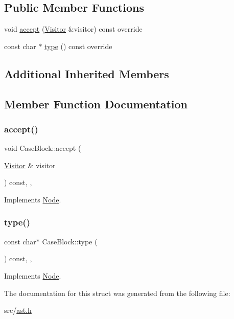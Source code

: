 \subsection*{Public Member Functions}
\begin{DoxyCompactItemize}
\item 
void \hyperlink{struct_case_block_aa49886b51bde7cb23e5c4faf1f32cd5e}{accept} (\hyperlink{struct_visitor}{Visitor} \&visitor) const override
\item 
const char $\ast$ \hyperlink{struct_case_block_a3c4f5d4f02856e2702c4b376914c44f9}{type} () const override
\end{DoxyCompactItemize}
\subsection*{Additional Inherited Members}


\subsection{Member Function Documentation}
\mbox{\label{struct_case_block_aa49886b51bde7cb23e5c4faf1f32cd5e}} 
\subsubsection{\texorpdfstring{accept()}{accept()}}
{\footnotesize\ttfamily void Case\+Block\+::accept (\begin{DoxyParamCaption}\item[{\hyperlink{struct_visitor}{Visitor} \&}]{visitor }\end{DoxyParamCaption}) const\hspace{0.3cm}{\ttfamily [inline]}, {\ttfamily [override]}, {\ttfamily [virtual]}}



Implements \hyperlink{struct_node_a10bd7af968140bbf5fa461298a969c71}{Node}.

\mbox{\label{struct_case_block_a3c4f5d4f02856e2702c4b376914c44f9}} 
\subsubsection{\texorpdfstring{type()}{type()}}
{\footnotesize\ttfamily const char$\ast$ Case\+Block\+::type (\begin{DoxyParamCaption}{ }\end{DoxyParamCaption}) const\hspace{0.3cm}{\ttfamily [inline]}, {\ttfamily [override]}, {\ttfamily [virtual]}}



Implements \hyperlink{struct_node_a82f29420d0a38efcc370352528e94e9b}{Node}.



The documentation for this struct was generated from the following file\+:\begin{DoxyCompactItemize}
\item 
src/\hyperlink{ast_8h}{ast.\+h}\end{DoxyCompactItemize}
